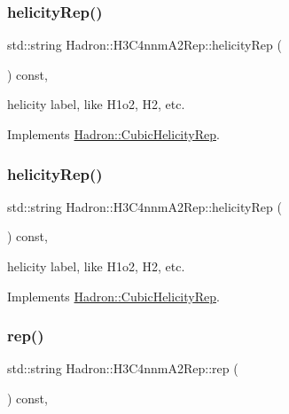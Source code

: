 \subsubsection{\texorpdfstring{helicityRep()}{helicityRep()}\hspace{0.1cm}{\footnotesize\ttfamily [2/3]}}
{\footnotesize\ttfamily std\+::string Hadron\+::\+H3\+C4nnm\+A2\+Rep\+::helicity\+Rep (\begin{DoxyParamCaption}{ }\end{DoxyParamCaption}) const\hspace{0.3cm}{\ttfamily [inline]}, {\ttfamily [virtual]}}

helicity label, like H1o2, H2, etc. 

Implements \mbox{\hyperlink{structHadron_1_1CubicHelicityRep_af1096946b7470edf0a55451cc662f231}{Hadron\+::\+Cubic\+Helicity\+Rep}}.

\mbox{\label{structHadron_1_1H3C4nnmA2Rep_acabc462818e030ca95a03f9ecf996e35}} 
\subsubsection{\texorpdfstring{helicityRep()}{helicityRep()}\hspace{0.1cm}{\footnotesize\ttfamily [3/3]}}
{\footnotesize\ttfamily std\+::string Hadron\+::\+H3\+C4nnm\+A2\+Rep\+::helicity\+Rep (\begin{DoxyParamCaption}{ }\end{DoxyParamCaption}) const\hspace{0.3cm}{\ttfamily [inline]}, {\ttfamily [virtual]}}

helicity label, like H1o2, H2, etc. 

Implements \mbox{\hyperlink{structHadron_1_1CubicHelicityRep_af1096946b7470edf0a55451cc662f231}{Hadron\+::\+Cubic\+Helicity\+Rep}}.

\mbox{\label{structHadron_1_1H3C4nnmA2Rep_a2e3cc9bd16d8097b2b57f500b0d82be1}} 
\subsubsection{\texorpdfstring{rep()}{rep()}\hspace{0.1cm}{\footnotesize\ttfamily [1/5]}}
{\footnotesize\ttfamily std\+::string Hadron\+::\+H3\+C4nnm\+A2\+Rep\+::rep (\begin{DoxyParamCaption}{ }\end{DoxyParamCaption}) const\hspace{0.3cm}{\ttfamily [inline]}, {\ttfamily [virtual]}}



